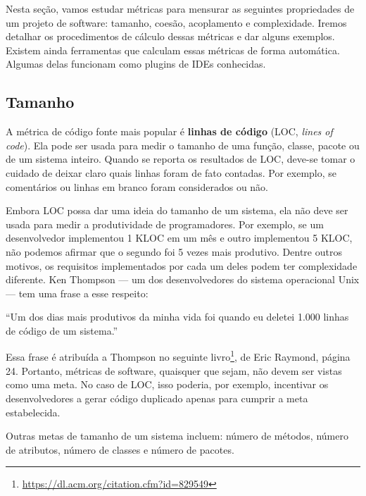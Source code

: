 \documentclass[
  11pt,
  twoside]{book}
\DeclareRobustCommand{\href}[2]{#2\footnote{\url{#1}}}
\renewenvironment{quote}{\centering \vspace{1.5ex} \begin{tcolorbox}[colback=backcolor, width=4.9in]}{\end{tcolorbox}}
\begin{document}
Nesta seção, vamos estudar métricas para mensurar as seguintes
propriedades de um projeto de software: tamanho, coesão, acoplamento e
complexidade. Iremos detalhar os procedimentos de cálculo dessas
métricas e dar alguns exemplos. Existem ainda ferramentas que calculam
essas métricas de forma automática. Algumas delas funcionam como plugins
de IDEs conhecidas.

\hypertarget{tamanho}{%
\subsection{Tamanho}\label{tamanho}}

 A métrica de código fonte mais popular é
\textbf{linhas de código} (LOC, \emph{lines of code}). Ela pode ser
usada para medir o tamanho de uma função, classe, pacote ou de um
sistema inteiro. Quando se reporta os resultados de LOC, deve-se tomar o
cuidado de deixar claro quais linhas foram de fato contadas. Por
exemplo, se comentários ou linhas em branco foram considerados ou não.

Embora LOC possa dar uma ideia do tamanho de um sistema, ela não deve
ser usada para medir a produtividade de programadores. Por exemplo, se
um desenvolvedor implementou 1 KLOC em um mês e outro implementou 5
KLOC, não podemos afirmar que o segundo foi 5 vezes mais produtivo.
Dentre outros motivos, os requisitos implementados por cada um deles
podem ter complexidade diferente. Ken Thompson --- um dos
desenvolvedores do sistema operacional Unix --- tem uma frase a esse
respeito:


\begin{quote}
``Um dos dias mais produtivos da minha vida foi quando eu deletei 1.000
linhas de código de um sistema.''
\end{quote}

Essa frase é atribuída a Thompson no seguinte
\href{https://dl.acm.org/citation.cfm?id=829549}{livro}, de Eric
Raymond, página 24. Portanto, métricas de software, quaisquer que sejam,
não devem ser vistas como uma meta. No caso de LOC, isso poderia, por
exemplo, incentivar os desenvolvedores a gerar código duplicado apenas
para cumprir a meta estabelecida.

Outras metas de tamanho de um sistema incluem: número de métodos, número
de atributos, número de classes e número de pacotes.
\end{document}
